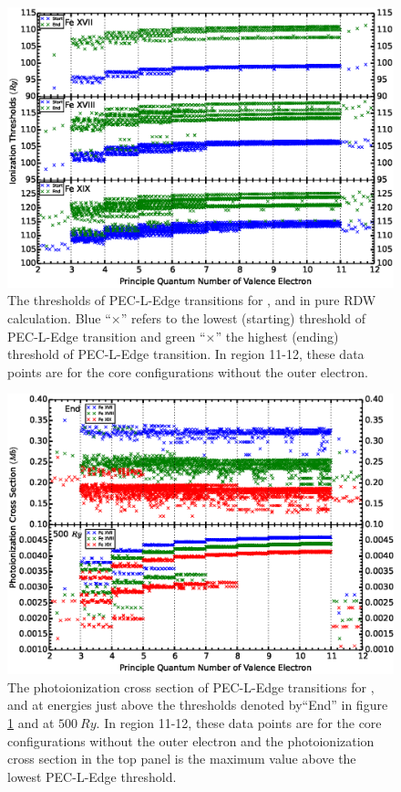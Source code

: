 \begin{figure}
	\centering
	\includegraphics[width=\textwidth]{figures_5/fe17_fe18_start_end}	
	\caption{The thresholds of PEC-L-Edge transitions for  ,  and  in pure RDW calculation. Blue ``$\times$'' refers to the lowest (starting) threshold of PEC-L-Edge transition and green ``$\times$'' the highest (ending) threshold of PEC-L-Edge transition. In region 11-12, these data points are for the core configurations without the outer electron.}
	\label{fig_fe17_fe18_fe19_thresholds_start_end}
\end{figure}

\begin{figure}
	\centering
	\includegraphics[width=\textwidth]{figures_5/fe17_fe18_end_500}	
	\caption{The photoionization cross section of PEC-L-Edge transitions for  ,  and  at energies just above the thresholds denoted by``End'' in figure \ref{fig_fe17_fe18_fe19_thresholds_start_end} and at $500~Ry$. In region 11-12, these data points are for the core configurations without the outer electron and the photoionization cross section in the top panel is the maximum value above the lowest PEC-L-Edge threshold.}
	\label{fig_fe17_fe18_fe19_pi_end_500ry}
\end{figure}

